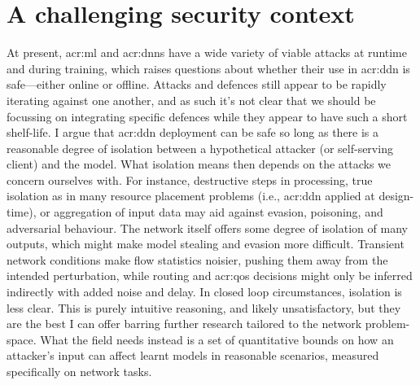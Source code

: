 \section{A challenging security context}
At present, \gls{acr:ml} and \glspl{acr:dnn} have a wide variety of viable attacks at runtime and during training, which raises questions about whether their use in \gls{acr:ddn} is safe---either online or offline.
Attacks and defences still appear to be rapidly iterating against one another, and as such it's not clear that we should be focussing on integrating specific defences while they appear to have such a short shelf-life.
I argue that \gls{acr:ddn} deployment can be safe so long as there is a reasonable degree of isolation between a hypothetical attacker (or self-serving client) and the model.
What isolation means then depends on the attacks we concern ourselves with.
For instance, destructive steps in processing, true isolation as in many resource placement problems (i.e., \gls{acr:ddn} applied at design-time), or aggregation of input data may aid against evasion, poisoning, and adversarial behaviour.
The network itself offers some degree of isolation of many outputs, which might make model stealing and evasion more difficult.
Transient network conditions make flow statistics noisier, pushing them away from the intended perturbation, while routing and \gls{acr:qos} decisions might only be inferred indirectly with added noise and delay.
In closed loop circumstances, isolation is less clear.
This is purely intuitive reasoning, and likely unsatisfactory, but they are the best I can offer barring further research tailored to the network problem-space.
What the field needs instead is a set of quantitative bounds on how an attacker's input can affect learnt models in reasonable scenarios, measured specifically on network tasks.

%
%


